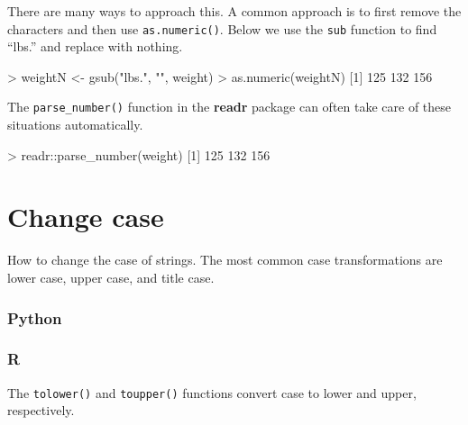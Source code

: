 \documentclass[
]{book}
\newenvironment{Shaded}{\begin{snugshade}}{\end{snugshade}}
\newcommand{\DecValTok}[1]{\textcolor[rgb]{0.00,0.00,0.81}{#1}}
\newcommand{\FunctionTok}[1]{\textcolor[rgb]{0.00,0.00,0.00}{#1}}
\newcommand{\NormalTok}[1]{#1}
\newcommand{\OtherTok}[1]{\textcolor[rgb]{0.56,0.35,0.01}{#1}}
\newcommand{\SpecialCharTok}[1]{\textcolor[rgb]{0.00,0.00,0.00}{#1}}
\newcommand{\StringTok}[1]{\textcolor[rgb]{0.31,0.60,0.02}{#1}}
\begin{document}
There are many ways to approach this. A common approach is to first remove the characters and then use \texttt{as.numeric()}. Below we use the \texttt{sub} function to find ``lbs.'' and replace with nothing.

\begin{Shaded}
\begin{Highlighting}[]
\SpecialCharTok{\textgreater{}}\NormalTok{ weightN }\OtherTok{\textless{}{-}} \FunctionTok{gsub}\NormalTok{(}\StringTok{"lbs."}\NormalTok{, }\StringTok{""}\NormalTok{, weight)}
\SpecialCharTok{\textgreater{}} \FunctionTok{as.numeric}\NormalTok{(weightN)}
\NormalTok{[}\DecValTok{1}\NormalTok{] }\DecValTok{125} \DecValTok{132} \DecValTok{156}
\end{Highlighting}
\end{Shaded}

The \texttt{parse\_number()} function in the \textbf{readr} package can often take care of these situations automatically.

\begin{Shaded}
\begin{Highlighting}[]
\SpecialCharTok{\textgreater{}}\NormalTok{ readr}\SpecialCharTok{::}\FunctionTok{parse\_number}\NormalTok{(weight)}
\NormalTok{[}\DecValTok{1}\NormalTok{] }\DecValTok{125} \DecValTok{132} \DecValTok{156}
\end{Highlighting}
\end{Shaded}

\hypertarget{change-case}{%
\section{Change case}\label{change-case}}

How to change the case of strings. The most common case transformations are lower case, upper case, and title case.

\hypertarget{python-20}{%
\subsubsection*{Python}\label{python-20}}

\hypertarget{r-20}{%
\subsubsection*{R}\label{r-20}}

The \texttt{tolower()} and \texttt{toupper()} functions convert case to lower and upper, respectively.
\end{document}
